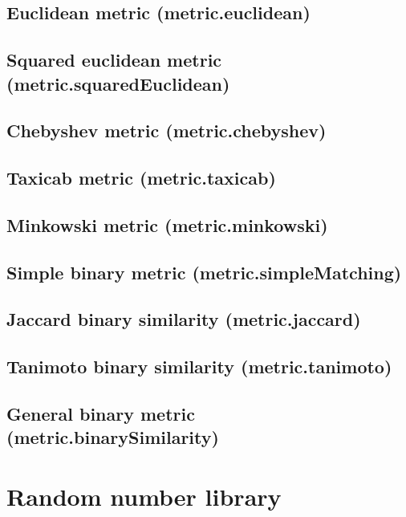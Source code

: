 \documentclass{article}
\theoremstyle{definition}
\begin{document}
\subsection{Euclidean metric (metric.euclidean)}

\subsection{Squared euclidean metric (metric.squaredEuclidean)}

\subsection{Chebyshev metric (metric.chebyshev)}

\subsection{Taxicab metric (metric.taxicab)}

\subsection{Minkowski metric (metric.minkowski)}

\subsection{Simple binary metric (metric.simpleMatching)}

\subsection{Jaccard binary similarity (metric.jaccard)}

\subsection{Tanimoto binary similarity (metric.tanimoto)}

\subsection{General binary metric (metric.binarySimilarity)}

\pagebreak

\section{Random number library}
\end{document}
